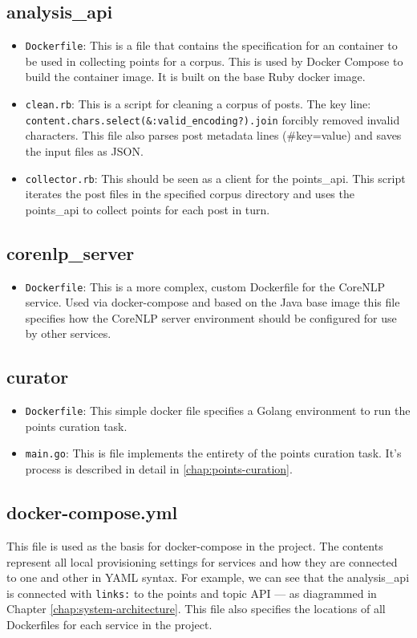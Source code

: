 \subsection*{analysis\_api}
  \begin{itemize}
    \item
      \texttt{Dockerfile}: This is a file that contains the specification for an container to be used in collecting points for a corpus. This is used by Docker Compose to build the container image. It is built on the base Ruby docker image.
    \item
      \texttt{clean.rb}: This is a script for cleaning a corpus of posts. The key line: \texttt{content.chars.select(\&:valid\_encoding?).join} forcibly removed invalid characters. This file also parses post metadata lines (\#key=value) and saves the input files as JSON.
    \item
      \texttt{collector.rb}: This should be seen as a client for the points\_api. This script iterates the post files in the specified corpus directory and uses the points\_api to collect points for each post in turn.
  \end{itemize}

\subsection*{corenlp\_server}
  \begin{itemize}
    \item
      \texttt{Dockerfile}: This is a more complex, custom Dockerfile for the CoreNLP service. Used via docker-compose and based on the Java base image this file specifies how the CoreNLP server environment should be configured for use by other services.
  \end{itemize}

\subsection*{curator}
  \begin{itemize}
    \item
      \texttt{Dockerfile}: This simple docker file specifies a Golang environment to run the points curation task.
    \item
      \texttt{main.go}: This is file implements the entirety of the points curation task. It's process is described in detail in \ref{chap:points-curation}.
  \end{itemize}

\subsection*{docker-compose.yml}
  This file is used as the basis for docker-compose in the project. The contents represent all local provisioning settings for services and how they are connected to one and other in YAML syntax. For example, we can see that the analysis\_api is connected with \texttt{links:} to the points and topic API --- as diagrammed in Chapter \ref{chap:system-architecture}. This file also specifies the locations of all Dockerfiles for each service in the project.

